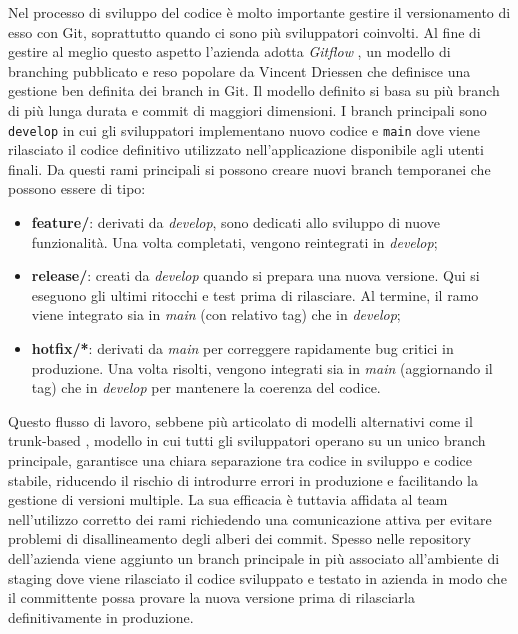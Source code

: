 \documentclass[target=bach,aauheader=,style=]{thud}
\begin{document}
Nel processo di sviluppo del codice è molto importante gestire il versionamento di esso con Git, soprattutto quando ci sono più sviluppatori coinvolti. Al fine di gestire al meglio questo aspetto
l'azienda adotta \textit{Gitflow} \cite{gitflow}, un modello di branching pubblicato e reso popolare da Vincent Driessen che definisce una gestione ben definita dei branch in Git. Il modello definito
si basa su più branch di più lunga durata e commit di maggiori dimensioni. I branch principali sono \texttt{develop} in cui gli sviluppatori implementano nuovo codice e \texttt{main} dove viene
rilasciato il codice definitivo utilizzato nell'applicazione disponibile agli utenti finali. Da questi rami principali si possono creare nuovi branch temporanei che possono essere di tipo:
\begin{itemize}
\item \textbf{feature/}: derivati da \textit{develop}, sono dedicati allo sviluppo di nuove funzionalità. Una volta completati, vengono reintegrati in \textit{develop};
\item \textbf{release/}: creati da \textit{develop} quando si prepara una nuova versione. Qui si eseguono gli ultimi ritocchi e test prima di rilasciare. Al termine, il ramo viene integrato sia in
\textit{main} (con relativo tag) che in \textit{develop};
\item \textbf{hotfix/*}: derivati da \textit{main} per correggere rapidamente bug critici in produzione. Una volta risolti, vengono integrati sia in \textit{main} (aggiornando il tag) che in
\textit{develop} per mantenere la coerenza del codice.
\end{itemize}
Questo flusso di lavoro, sebbene più articolato di modelli alternativi come il trunk-based \cite{trunkbased_dev}, modello in cui tutti gli sviluppatori operano su un unico branch principale, garantisce una
chiara separazione tra codice in sviluppo e codice stabile, riducendo il rischio di introdurre errori in produzione e facilitando la gestione di versioni multiple. La sua efficacia è tuttavia affidata
al team nell'utilizzo corretto dei rami richiedendo una comunicazione attiva per evitare problemi di disallineamento degli alberi dei commit. Spesso nelle repository dell'azienda viene aggiunto un branch
principale in più associato all'ambiente di staging dove viene rilasciato il codice sviluppato e testato in azienda in modo che il committente possa provare la nuova versione prima di rilasciarla
definitivamente in produzione.
\end{document}
